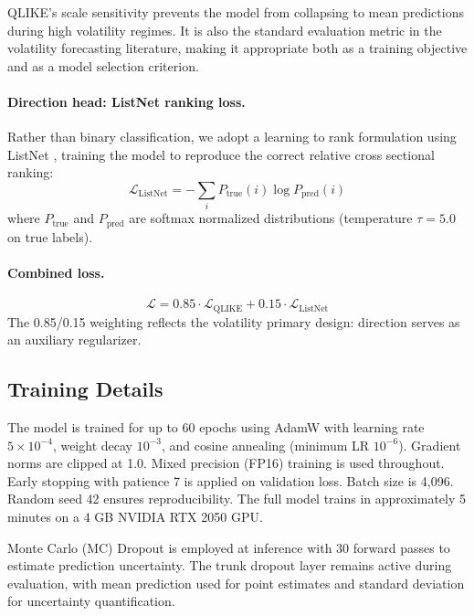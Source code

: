 \documentclass[10pt, twocolumn, a4paper]{article}
\begin{document}
QLIKE's scale sensitivity prevents the model from collapsing to mean
predictions during high volatility regimes. It is also the standard
evaluation metric in the volatility forecasting literature, making it
appropriate both as a training objective and as a model selection criterion.

\paragraph{Direction head: ListNet ranking loss.}
Rather than binary classification, we adopt a learning to rank
formulation using ListNet \citep{cao2007learning}, training the model to
reproduce the correct relative cross sectional ranking:
\begin{equation}
    \mathcal{L}_{\text{ListNet}} = -\sum_{i} P_{\text{true}}(i)
    \log P_{\text{pred}}(i)
\end{equation}
where $P_{\text{true}}$ and $P_{\text{pred}}$ are softmax normalized
distributions (temperature $\tau = 5.0$ on true labels).

\paragraph{Combined loss.}
\begin{equation}
    \mathcal{L} = 0.85 \cdot \mathcal{L}_{\text{QLIKE}} +
    0.15 \cdot \mathcal{L}_{\text{ListNet}}
\end{equation}
The 0.85/0.15 weighting reflects the volatility primary design: direction
serves as an auxiliary regularizer.

\subsection{Training Details}

The model is trained for up to 60 epochs using AdamW
\citep{loshchilov2019decoupled} with learning rate $5 \times 10^{-4}$,
weight decay $10^{-3}$, and cosine annealing (minimum LR $10^{-6}$).
Gradient norms are clipped at 1.0. Mixed precision (FP16) training is used
throughout. Early stopping with patience 7 is applied on validation loss.
Batch size is 4{,}096. Random seed 42 ensures reproducibility. The full
model trains in approximately 5 minutes on a 4 GB NVIDIA RTX 2050 GPU.

Monte Carlo (MC) Dropout is employed at inference with 30 forward passes
to estimate prediction uncertainty. The trunk dropout layer remains active
during evaluation, with mean prediction used for point estimates and
standard deviation for uncertainty quantification.
\end{document}
